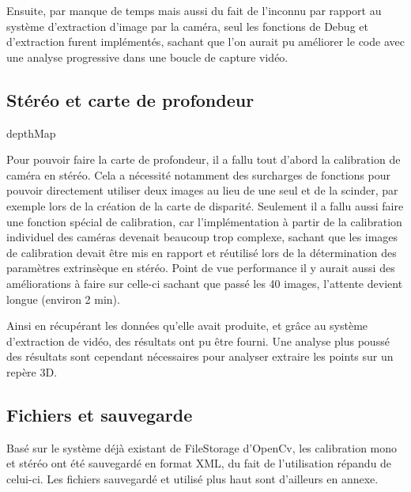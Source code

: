 \documentclass{article}
\begin{document}
Ensuite, par manque de temps mais aussi du fait de l'inconnu par rapport au système d'extraction d'image par la caméra, seul les fonctions de Debug et d'extraction furent implémentés, sachant que l'on aurait pu améliorer le code avec une analyse progressive dans une boucle de capture vidéo. 

\newpage
\subsection{Stéréo et carte de profondeur}

    depthMap
    
Pour pouvoir faire la carte de profondeur, il a fallu tout d'abord la calibration de caméra en stéréo.
Cela a nécessité notamment des surcharges de fonctions pour pouvoir directement utiliser deux images au lieu de une seul et de la scinder, par exemple lors de la création de la carte de disparité. Seulement il a fallu aussi faire une fonction spécial de calibration, car l'implémentation à partir de la calibration individuel des caméras devenait beaucoup trop complexe, sachant que les images de calibration devait être mis en rapport et réutilisé lors de la détermination des paramètres extrinsèque en stéréo.
Point de vue performance il y aurait aussi des améliorations à faire sur celle-ci sachant que passé les 40 images, l'attente devient longue (environ 2 min).

Ainsi en récupérant les données qu'elle avait produite, et grâce au système d'extraction de vidéo, des résultats ont pu être fourni. 
Une analyse plus poussé des résultats sont cependant nécessaires pour analyser extraire les points sur un repère 3D.

    \newpage
\subsection{Fichiers et sauvegarde}

Basé sur le système déjà existant de FileStorage d'OpenCv, les calibration mono et stéréo ont été sauvegardé en format XML, du fait de l'utilisation répandu de celui-ci.
Les fichiers sauvegardé et utilisé plus haut sont d'ailleurs en annexe.

    

\end{document}
